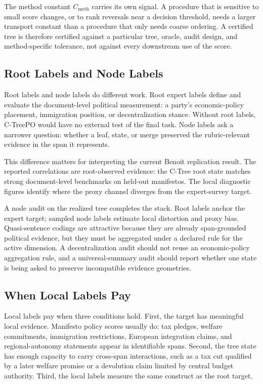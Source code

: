 The method constant \(C_{\mathrm{meth}}\) carries its own signal. A
procedure that is sensitive to small score changes, or to rank
reversals near a decision threshold, needs a larger transport
constant than a procedure that only needs coarse ordering. A
certified tree is therefore certified against a particular tree,
oracle, audit design, and method-specific tolerance, not against
every downstream use of the score.

\subsection{Root Labels and Node Labels}

Root labels and node labels do different work. Root expert labels define and
evaluate the document-level political measurement: a party's economic-policy
placement, immigration position, or decentralization stance. Without
root labels, C-TreePO would have no external test of the final task.
Node labels ask a narrower question: whether a leaf, state, or merge preserved the
rubric-relevant evidence in the span it represents.

This difference matters for interpreting the current Benoit
replication result. The reported correlations are root-observed evidence: the
C-Tree root state matches strong document-level benchmarks on
held-out manifestos. The local diagnostic figures identify where the
proxy channel diverges from the expert-survey target.

A node audit on the realized tree completes the stack. Root labels
anchor the expert target; sampled node labels estimate local
distortion and proxy bias. Quasi-sentence codings are attractive
because they are already span-grounded political evidence, but they
must be aggregated under a declared rule for the active dimension. A
decentralization audit should not reuse an economic-policy
aggregation rule, and a universal-summary audit should report whether
one state is being asked to preserve incompatible evidence
geometries.

\subsection{When Local Labels Pay}

Local labels pay when three conditions hold. First, the target has meaningful
local evidence. Manifesto policy scores usually do: tax pledges, welfare
commitments, immigration restrictions, European integration claims, and
regional-autonomy statements appear in identifiable spans. Second, the tree
state has enough capacity to carry cross-span interactions, such as a tax cut
qualified by a later welfare promise or a devolution claim limited by central
budget authority. Third, the local labels measure the same construct as the
root target.

